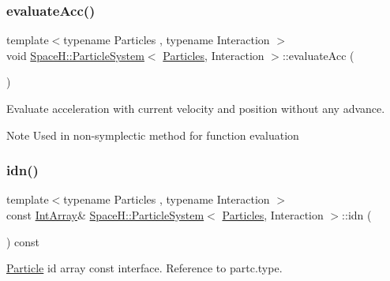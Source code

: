 \subsubsection{\texorpdfstring{evaluate\+Acc()}{evaluateAcc()}}
{\footnotesize\ttfamily template$<$typename Particles , typename Interaction $>$ \\
void \mbox{\hyperlink{class_space_h_1_1_particle_system}{Space\+H\+::\+Particle\+System}}$<$ \mbox{\hyperlink{struct_space_h_1_1_particles}{Particles}}, Interaction $>$\+::evaluate\+Acc (\begin{DoxyParamCaption}{ }\end{DoxyParamCaption})\hspace{0.3cm}{\ttfamily [inline]}}



Evaluate acceleration with current velocity and position without any advance. 

\begin{DoxyNote}{Note}
Used in non-\/symplectic method for function evaluation 
\end{DoxyNote}
\mbox{\label{class_space_h_1_1_particle_system_a2d5c1b26f3b8a85cd07deb3ade85180d}} 
\subsubsection{\texorpdfstring{idn()}{idn()}\hspace{0.1cm}{\footnotesize\ttfamily [1/2]}}
{\footnotesize\ttfamily template$<$typename Particles , typename Interaction $>$ \\
const \mbox{\hyperlink{class_space_h_1_1_particle_system_a833833592d4c4750bbfa021610e94619}{Int\+Array}}\& \mbox{\hyperlink{class_space_h_1_1_particle_system}{Space\+H\+::\+Particle\+System}}$<$ \mbox{\hyperlink{struct_space_h_1_1_particles}{Particles}}, Interaction $>$\+::idn (\begin{DoxyParamCaption}{ }\end{DoxyParamCaption}) const\hspace{0.3cm}{\ttfamily [inline]}}



\mbox{\hyperlink{struct_space_h_1_1_particle}{Particle}} id array const interface. Reference to partc.\+type. 

